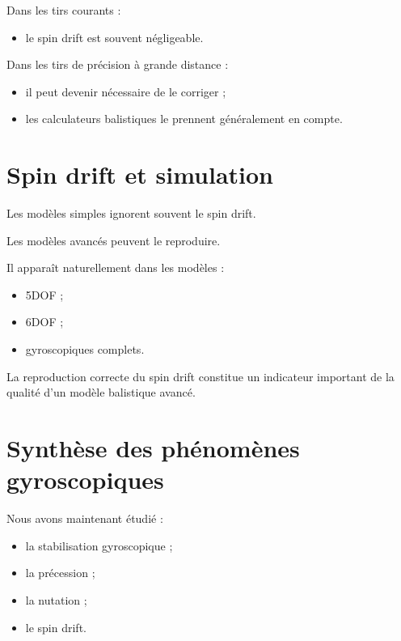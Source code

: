 Dans les tirs courants :

\begin{itemize}
    \item le spin drift est souvent négligeable.
\end{itemize}

Dans les tirs de précision à grande distance :

\begin{itemize}
    \item il peut devenir nécessaire de le corriger ;
    \item les calculateurs balistiques le prennent généralement en compte.
\end{itemize}

\section{Spin drift et simulation}

Les modèles simples ignorent souvent le spin drift.

Les modèles avancés peuvent le reproduire.

Il apparaît naturellement dans les modèles :

\begin{itemize}
    \item 5DOF ;
    \item 6DOF ;
    \item gyroscopiques complets.
\end{itemize}

\begin{simulation}

La reproduction correcte du spin drift constitue un indicateur important de
la qualité d'un modèle balistique avancé.

\end{simulation}

\section{Synthèse des phénomènes gyroscopiques}

Nous avons maintenant étudié :

\begin{itemize}
    \item la stabilisation gyroscopique ;
    \item la précession ;
    \item la nutation ;
    \item le spin drift.
\end{itemize}

